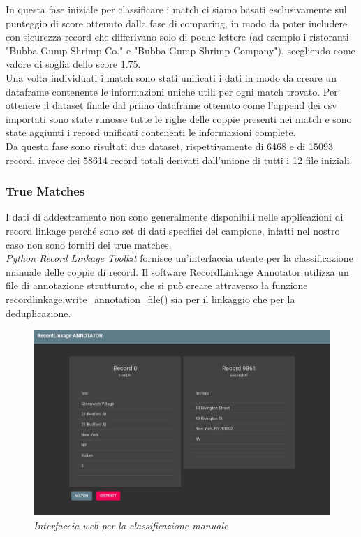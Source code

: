 \documentclass[a4paper,12pt]{article}
\begin{document}
\noindent In questa fase iniziale per classificare i match ci siamo basati esclusivamente sul punteggio di score ottenuto dalla fase di comparing, in modo da poter includere con sicurezza record che differivano solo di poche lettere (ad esempio i ristoranti "Bubba Gump Shrimp Co." e "Bubba Gump Shrimp Company"), scegliendo come valore di soglia dello score 1.75. \\

\noindent Una volta individuati i match sono stati unificati i dati in modo da creare un dataframe contenente le informazioni uniche utili per ogni match trovato. Per ottenere il dataset finale dal primo dataframe ottenuto come l'append dei csv importati sono state rimosse tutte le righe delle coppie presenti nei match e sono state aggiunti i record unificati contenenti le informazioni complete. \\

\noindent Da questa fase sono risultati due dataset, rispettivamente di 6468 e di 15093 record, invece dei 58614 record totali derivati dall'unione di tutti i 12 file iniziali.

\subsubsection*{True Matches}
I dati di addestramento non sono generalmente disponibili nelle applicazioni di record linkage perché sono set di dati specifici del campione, infatti nel nostro caso non sono forniti dei true matches. \\

\noindent \textit{Python Record Linkage Toolkit}  fornisce un'interfaccia utente per la classificazione manuale delle coppie di record. Il software RecordLinkage Annotator utilizza un file di annotazione strutturato, che si può creare attraverso la funzione \href{https://recordlinkage.readthedocs.io/en/latest/annotation.html}{recordlinkage.write\_annotation\_file()} sia per il linkaggio che per la deduplicazione.\\
\begin{figure}[H]
	\centering
	\includegraphics[width=0.8\linewidth]{img/matchCenter.png}
	\caption{\textit{Interfaccia web per la classificazione manuale}}
\end{figure}
\end{document}
